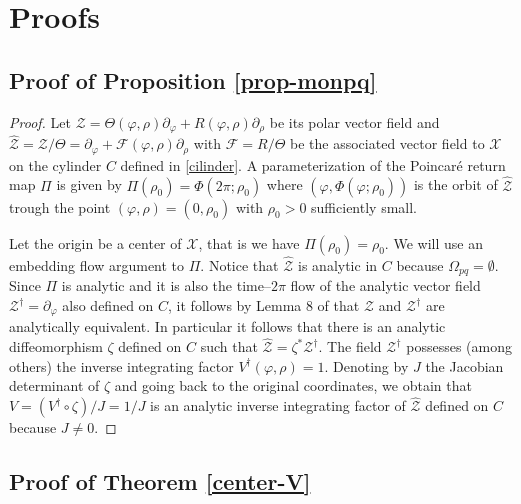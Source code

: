 \documentclass[12pt]{amsart}
\begin{document}
\section{Proofs}

\subsection{Proof of Proposition \ref{prop-monpq}}

\begin{proof}
Let $\mathcal{Z} = \Theta(\varphi, \rho) \partial_\varphi + R(\varphi, \rho) \partial_\rho$ be its polar vector field and $\hat{\mathcal{Z}} = \mathcal{Z}/ \Theta = \partial_\varphi + \mathcal{F}(\varphi, \rho) \partial_\rho$ with $\mathcal{F} = R/\Theta$ be the associated vector field to $\mathcal{X}$ on the cylinder $C$ defined in \eqref{cilinder}. A parameterization of the Poincar\'e return map $\Pi$ is given by $\Pi(\rho_0) = \Phi(2 \pi; \rho_0)$ where $(\varphi, \Phi(\varphi; \rho_0))$ is the orbit of $\hat{\mathcal{Z}}$ trough the point $(\varphi, \rho) = (0, \rho_0)$ with $\rho_0 > 0$ sufficiently small.

Let the origin be a center of $\mathcal{X}$, that is we have $\Pi(\rho_0) = \rho_0$. We will use an embedding flow argument \cite{EncPer} to $\Pi$. Notice that $\hat{\mathcal{Z}}$ is analytic in $C$ because $\Omega_{pq} = \emptyset$. Since $\Pi$ is analytic and it is also the time--$2 \pi$ flow of the analytic vector field $\mathcal{Z}^\dag = \partial_\varphi$ also defined on $C$, it follows by Lemma 8 of \cite{Li-LLi-Xia} that $\hat{\mathcal{Z}}$ and $\mathcal{Z}^\dag$ are analytically equivalent. In particular it follows that there is an analytic diffeomorphism $\zeta$ defined on $C$ such that $\hat{\mathcal{Z}}= \zeta^* \mathcal{Z}^\dag$. The field $\mathcal{Z}^\dag$ possesses (among others) the inverse integrating factor $V^\dag(\varphi, \rho) = 1$. Denoting by $J$ the Jacobian determinant of $\zeta$ and going back to the original coordinates, we obtain that  $V = (V^\dag \circ \zeta)/J = 1/J$ is an analytic inverse integrating factor of $\hat{\mathcal{Z}}$ defined on $C$ because $J \neq 0$.
\end{proof}


\subsection{Proof of Theorem \ref{center-V}}
\end{document}
